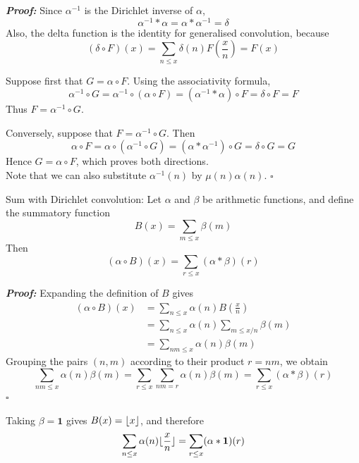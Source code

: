 \documentclass[a4paper,11pt,abstracton]{scrartcl}
\DeclarePairedDelimiter{\floor}{\lfloor}{\rfloor}
\theoremstyle{dotlessP}
\theoremstyle{dotlessS}
\theoremstyle{remark}
\theoremstyle{definition}
\begin{document}
\begin{claim_box}
\textbf{\textit{Proof:}}
Since $\alpha^{-1}$ is the Dirichlet inverse of $\alpha$,
\[
    \alpha^{-1}*\alpha
      =\alpha*\alpha^{-1}=\delta
\]
Also, the delta function is the identity for generalised convolution,
because
\[
    (\delta\circ F)(x)
      =\sum_{n\leq x}\delta(n)F\!\left(\frac xn\right)
      =F(x)
\]

Suppose first that $G=\alpha\circ F$. Using the associativity formula,
\[
    \alpha^{-1}\circ G
      =\alpha^{-1}\circ(\alpha\circ F)
      =(\alpha^{-1}*\alpha)\circ F
      =\delta\circ F=F
\]
Thus $F=\alpha^{-1}\circ G$.

Conversely, suppose that $F=\alpha^{-1}\circ G$. Then
\[
    \alpha\circ F
      =\alpha\circ(\alpha^{-1}\circ G)
      =(\alpha*\alpha^{-1})\circ G
      =\delta\circ G=G
\]
Hence $G=\alpha\circ F$, which proves both directions.
\\Note that we can also substitute $\alpha^{-1}(n)$ by $\mu(n)\alpha(n)$.
\hfill$\square$
\end{claim_box}

\begin{mainbox}{Sum with Dirichlet convolution:}
Let $\alpha$ and $\beta$ be arithmetic functions, and define the
summatory function
\[
    B(x)=\sum_{m\leq x}\beta(m)
\]
Then
\[
    (\alpha\circ B)(x)
      =\sum_{r\leq x}(\alpha*\beta)(r)
\]
\end{mainbox}

\begin{claim_box}
\textbf{\textit{Proof:}}
Expanding the definition of $B$ gives
\begin{align*}
    (\alpha\circ B)(x)
      &=\sum_{n\leq x}\alpha(n)
        B\!\left(\frac xn\right)\\
      &=\sum_{n\leq x}\alpha(n)
        \sum_{m\leq x/n}\beta(m)\\
      &=\sum_{nm\leq x}\alpha(n)\beta(m)
\end{align*}
Grouping the pairs $(n,m)$ according to their product $r=nm$, we
obtain
\[
    \sum_{nm\leq x}\alpha(n)\beta(m)
      =\sum_{r\leq x}\sum_{nm=r}\alpha(n)\beta(m)
      =\sum_{r\leq x}(\alpha*\beta)(r)
\]
\hfill$\square$
\end{claim_box}

\begin{example_box}
Taking $\beta=\mathbf{1}$ gives $B(x)=\floor{x}$, and therefore
\[
    \sum_{n\leq x}\alpha(n)\floor{\frac xn}
      =\sum_{r\leq x}(\alpha*\mathbf{1})(r)
\]
\end{example_box}
\end{document}
